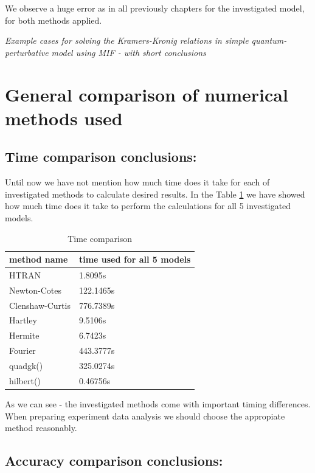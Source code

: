 \documentclass[12pt,twoside,a4paper]{article}
\numberwithin{equation}{subsection}
\numberwithin{figure}{subsection}
\begin{document}
We observe a huge error as in all previously chapters for the investigated model, for both methods applied.

\textit{Example cases for solving the Kramers-Kronig relations in simple quantum-perturbative model using MIF - with short
conclusions}


\section{General comparison of numerical methods used} \label{chap:comparison}

\subsection{Time comparison conclusions:} \label{chap:gencom_time}

Until now we have not mention how much time does it take for each of investigated methods to calculate desired results. In the
Table \ref{gencom_time} we have showed how much time does it take to perform the calculations for all 5 investigated models.

\begin{table}
  \caption{Time comparison} \label{gencom_time} 
  \begin{tabular}{l l}
    method name  &  time used for all 5 models \\
    \hline
    HTRAN & 1.8095s \\
    Newton-Cotes &  122.1465s \\
    Clenshaw-Curtis & 776.7389s \\
    Hartley & 9.5106s \\
    Hermite & 6.7423s \\
    Fourier & 443.3777s \\
    quadgk() & 325.0274s \\
    hilbert() & 0.46756s \\
    \hline
  \end{tabular}
\end{table} 

As we can see - the investigated methods come with important timing differences. When preparing experiment data analysis we should
choose the appropiate method reasonably.

\subsection{Accuracy comparison conclusions:} \label{chap:gencom_accuracy}
\end{document}
